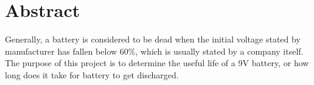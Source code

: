 \section{Abstract}
Generally, a battery is considered to be dead when the initial voltage stated by manufacturer has fallen below 60\%, which is usually stated by a company itself. The purpose of this project is to determine the useful life of a 9V battery, or how long does it take for battery to get discharged.
